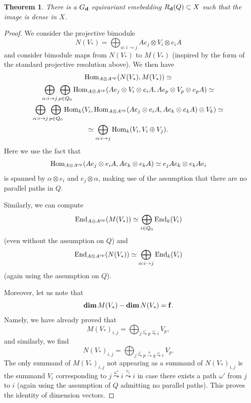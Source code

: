 \documentclass[12pt,a4paper]{amsart}
\numberwithin{equation}{section}
\newtheorem{thm}{Theorem}[section]
\theoremstyle{remark}
\begin{document}
\begin{thm}
There is a $G_{\bf d}$ equivariant emebedding $R_{\bf d}(Q)\subset X$ such that 
the image is dense in $X$.
\end{thm}
\begin{proof}
We consider the projective bimodule
$$N(V_*)=\bigoplus_{\alpha:i\rightarrow j}Ae_j\otimes V_i\otimes e_iA$$
and consider bimodule maps from $N(V_*)$ to $M(V_*)$ (inspired by the form of the standard projective resolution above).
We then have
\begin{multline*}
{\rm Hom}_{A\otimes A^{\rm op}}(N(V_*),M(V_*))\simeq\\
\bigoplus_{\alpha:i\rightarrow j}\bigoplus_{p\in Q_0}{\rm Hom}_{A\otimes A^{\rm op}}(Ae_j\otimes V_i\otimes e_iA,Ae_p\otimes V_p\otimes e_pA)\simeq\\
\bigoplus_{\alpha:i\rightarrow j}\bigoplus_{p\in Q_0}{\rm Hom}_k(V_i,{\rm Hom}_{A\otimes A^{\rm op}}(Ae_j\otimes e_iA,Ae_k\otimes e_kA)\otimes V_k)\simeq\\
\simeq\bigoplus_{\alpha:i\rightarrow j}{\rm Hom}_k(V_i, V_i\oplus V_j).
\end{multline*}
Here we use the fact that $${\rm Hom}_{A\otimes A^{\rm op}}(Ae_j\otimes e_iA,Ae_k\otimes e_kA)\simeq e_jAe_k\otimes e_kAe_i$$
is spanned by $\alpha\otimes e_i$ and $e_j\otimes \alpha$, making use of the assumption that there are no parallel paths in $Q$.

Similarly, we can compute
$${\rm End}_{A\otimes A^{\rm op}}(M(V_*))\simeq\bigoplus_{i\in Q_0}{\rm End}_k(V_i)$$
(even without the assumption on $Q$) and
$${\rm End}_{A\otimes A^{\rm op}}(N(V_*))\simeq\bigoplus_{\alpha:i\rightarrow j}{\rm End}_k(V_i)$$
(again using the assumption on $Q$).

Moreover, let us note that 
$${\rm\bf dim}\, M(V_*)-{\rm\bf dim}\, N(V_*)={\bf f}.$$
Namely, we have already proved that
$$M(V_*)_{i,j}=\bigoplus_{j\stackrel{\omega'}{\leadsto}p\stackrel{\omega}{\leadsto}i}V_p,$$
and similarly, we find
$$N(V_*)_{i,j}=\bigoplus_{j\stackrel{\omega'}{\leadsto}p\stackrel{\alpha}{\rightarrow}q\stackrel{\omega}{\leadsto}i}V_p.$$
The only summand of $M(V_*)_{i,j}$ not appearing as a summand of $N(V_*)_{i,j}$ is the summand $V_i$ corresponding to $j\stackrel{\omega'}{\leadsto}i\stackrel{e_i}{\leadsto}i$ in case there exists a path $\omega'$ from $j$ to $i$ (again using the assumption of $Q$ admitting no parallel paths). This proves the identity of dimension vectors.


\end{proof}
\end{document}
